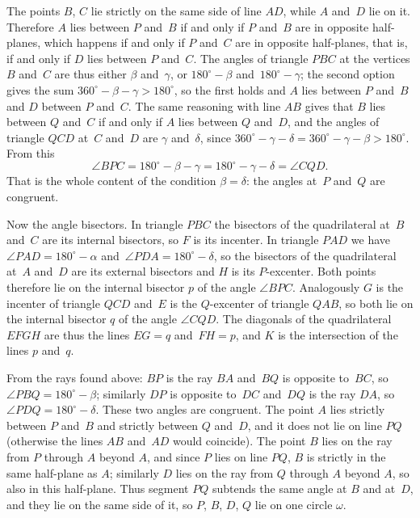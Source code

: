 {    The points $B$, $C$ lie strictly on the same side of line $AD$, while $A$ and~$D$ lie on it. Therefore $A$ lies between $P$ and~$B$ if and only if $P$ and~$B$ are in opposite half-planes, which happens if and only if $P$ and~$C$ are in opposite half-planes, that is, if and only if $D$ lies between $P$ and~$C$. The angles of triangle $PBC$ at the vertices $B$ and~$C$ are thus either $\beta$ and~$\gamma$, or $180^\circ - \beta$ and~$180^\circ - \gamma$; the second option gives the sum $360^\circ - \beta - \gamma > 180^\circ$, so the first holds and $A$ lies between $P$ and~$B$ and $D$ between $P$ and~$C$. The same reasoning with line $AB$ gives that $B$ lies between $Q$ and~$C$ if and only if $A$ lies between $Q$ and~$D$, and the angles of triangle $QCD$ at~$C$ and~$D$ are $\gamma$ and~$\delta$, since $360^\circ - \gamma - \delta = 360^\circ - \gamma - \beta > 180^\circ$. From this
    $$
    \angle BPC = 180^\circ - \beta - \gamma = 180^\circ - \gamma - \delta = \angle CQD.
    $$
    That is the whole content of the condition $\beta = \delta$: the angles at~$P$ and~$Q$ are congruent.

    Now the angle bisectors. In triangle $PBC$ the bisectors of the quadrilateral at~$B$ and~$C$ are its internal bisectors, so $F$ is its incenter. In triangle $PAD$ we have $\angle PAD = 180^\circ - \alpha$ and~$\angle PDA = 180^\circ - \delta$, so the bisectors of the quadrilateral at~$A$ and~$D$ are its external bisectors and $H$ is its $P$-excenter. Both points therefore lie on the internal bisector $p$ of the angle $\angle BPC$. Analogously $G$ is the incenter of triangle $QCD$ and~$E$ is the $Q$-excenter of triangle $QAB$, so both lie on the internal bisector $q$ of the angle $\angle CQD$. The diagonals of the quadrilateral $EFGH$ are thus the lines $EG = q$ and~$FH = p$, and $K$ is the intersection of the lines $p$ and~$q$.

    From the rays found above: $BP$ is the ray $BA$ and~$BQ$ is opposite to~$BC$, so $\angle PBQ = 180^\circ - \beta$; similarly $DP$ is opposite to~$DC$ and~$DQ$ is the ray $DA$, so $\angle PDQ = 180^\circ - \delta$. These two angles are congruent. The point $A$ lies strictly between $P$ and~$B$ and strictly between $Q$ and~$D$, and it does not lie on line $PQ$ (otherwise the lines $AB$ and~$AD$ would coincide). The point $B$ lies on the ray from $P$ through $A$ beyond $A$, and since $P$ lies on line $PQ$, $B$ is strictly in the same half-plane as $A$; similarly $D$ lies on the ray from $Q$ through $A$ beyond $A$, so also in this half-plane. Thus segment $PQ$ subtends the same angle at $B$ and at~$D$, and they lie on the same side of it, so $P$, $B$, $D$, $Q$ lie on one circle $\omega$.

}
